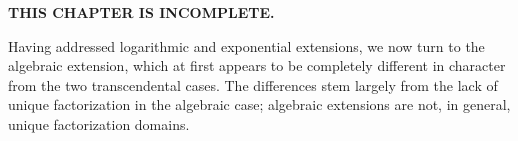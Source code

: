 

{\bf THIS CHAPTER IS INCOMPLETE.}

Having addressed logarithmic and exponential extensions, we now turn
to the algebraic extension, which at first appears to be completely
different in character from the two transcendental cases.  The
differences stem largely from the lack of unique factorization in the
algebraic case; algebraic extensions are not, in general, unique
factorization domains.

\begin{comment}

To justify that statement, let's begin by trying to attack algebraic
extensions in the same manner as the two transcendental cases.

$$(\sum_i a_i \theta^i)' = \sum_i ( a_i' \theta^i + a_i (\theta^{i})')$$

Presumably, we know how to differentiate $\theta$, so let's write
$(\theta^i)' = \sum_j \psi_{i,j} \theta^j$:

$$(\sum_i a_i \theta^i)' = \sum_i ( a_i' \theta^i + a_i \sum_j \psi_{i,j} \theta^j)$$

Writing the $a_i$'s as a column vector $A$, we'll end up with a matrix equation:

$$I = A' + \Psi A$$

This is superficially similar to a Risch equation; it's a matrix Risch
equation.  To proceed in the same manner as before, we'd now have to
construct partial fractions expansions of everything and begin looking
at how cancellation might occur between our various components.  The
variety of possible cancelations between our terms seems daunting.

\vfill\eject

$$\int y\,dx \qquad y^2 = 4-x^2$$

Let's assume that our solution has the form $S = ay+b+\ln (cy+d)$, where $a$
and $b$ are rational functions in $x$ and $c$ is a polynomial in $x$.

$$S' = a' y + a y' + b' + \frac{c'y+cy'+d'}{cy+d}$$
$$2 y y' = -2x \qquad y' = -\frac{x}{y} = - \frac{x}{4-x^2}y$$
$$S' = y = (a' - a \frac{x}{4-x^2})y + b' + \frac{(c' - c \frac{x}{4-x^2})y+d}{cy+d}$$
$$S' = y = (a' - a \frac{x}{4-x^2})y + b' + \frac{(c' - c \frac{x}{4-x^2})y+d}{cy+d}\frac{cy-d}{cy-d}$$
$$S' = y = (a' - a \frac{x}{4-x^2})y + b' + \frac{(c' - c \frac{x}{4-x^2})cy^2+cdy -(c' - c \frac{x}{4-x^2})dy-d^2}{c^2y^2-d^2}$$
$$S' = y = (a' - a \frac{x}{4-x^2})y + b' + \frac{(c' - c \frac{x}{4-x^2})c(4-x^2)+cdy -(c' - c \frac{x}{4-x^2})dy-d^2}{c^2(4-x^2)-d^2}$$
$$S' = y = (a' - a \frac{x}{4-x^2})y + b' + \frac{(c'(4-x^2) - c x)c+cdy -(c' - c \frac{x}{4-x^2})dy-d^2}{c^2(4-x^2)-d^2}$$
$$S' = y = (a' - a \frac{x}{4-x^2} + \frac{cd-(c' - c \frac{x}{4-x^2})d}{c^2(4-x^2)-d^2})y + b' + \frac{(c'(4-x^2) - c x)c -d^2}{c^2(4-x^2)-d^2}$$


The correct answer is

$$S = 2i\ln(ix-y)+\frac{x}{2}y$$

Instead, we'll use a different approach...

\vfill\eject

\end{comment}

